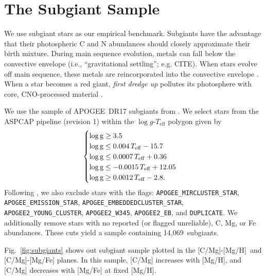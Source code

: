\documentclass[fleqn,
usenatbib]{mnras}
\newcommand{\nsubgiants}{14,069}
\newcommand{\apogee}{APOGEE}
\newcommand{\caah}{[C/Mg]-[Mg/H]}
\newcommand{\caafe}{[C/Mg]-[Mg/Fe]}
\newcommand{\dbadd}[1]{{\color{Thistle} #1}}
\begin{document}
\section{The Subgiant Sample}\label{sec:data_selection}




We use subgiant stars as our empirical benchmark.
Subgiants have the advantage that their photospheric C and N abundances should closely approximate their birth mixture.
During main sequence evolution, metals can fall below the convective envelope (i.e., ``gravitational settling''; e.g. \dbadd{CITE}).
When stars evolve off main sequence, these metals are reincorporated into the convective envelope \citep[]{gratton+00, souto19}. 
When a star becomes a red giant, \textit{first dredge up} pollutes its photosphere with core, CNO-processed material
\citep{iben67, KL14}.

We use the sample of \apogee\ DR17 subgiants from \citet{jack}. We select stars from the ASPCAP pipeline (revision 1) within the $\log g$-$T_\text{eff}$ polygon given by
 \begin{equation}
    \begin{cases} \label{eq:subgiant_selection}
        \log \text{g} \geq 3.5 \\
        \log \text{g} \leq 0.004\,T_{\rm eff} - 15.7 \\
        \log \text{g} \leq 0.0007\,T_{\rm eff} + 0.36 \\
        \log \text{g} \leq -0.0015\,T_{\rm eff} + 12.05 \\
        \log \text{g} \geq 0.0012\,T_{\rm eff} - 2.8. \\
    \end{cases}
\end{equation}
Following \citet{jack}, we also exclude stars with the flags:
        \verb|APOGEE_MIRCLUSTER_STAR|,
        \verb|APOGEE_EMISSION_STAR|,
        \verb|APOGEE_EMBEDDEDCLUSTER_STAR|,
        \verb|APOGEE2_YOUNG_CLUSTER|,
        \verb|APOGEE2_W345|,
        \verb|APOGEE2_EB|, and
        \verb|DUPLICATE|.
We additionally remove stars with no reported (or flagged unreliable), C, Mg, or Fe abundances. These cuts yield a sample containing \nsubgiants\ subgiants.


Fig.~\ref{fig:subgiants} shows out subgiant sample plotted in the \caah\ and \caafe{} planes.\footnotemark{} In this sample, [C/Mg] increases with [Mg/H], and [C/Mg] decreases with [Mg/Fe] at fixed [Mg/H]. 
\end{document}
